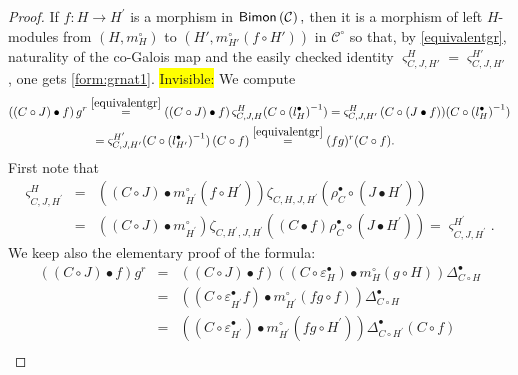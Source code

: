 \documentclass[nosumlimits,twoside]{amsart}
\theoremstyle{definition}
\theoremstyle{remark}
\newenvironment{invisible}{{\noindent\sc \colorbox{yellow}{Invisible:}\;}\color{gray}}{\medskip}
\newcommand{\Cc}{\mathcal{C}}
\def\Bimon{{\sf Bimon}}
\begin{document}
\begin{proof}
If $f:H\rightarrow H^{\prime }$ is a morphism in $\Bimon \left(
\mathcal{C}\right) ,$ then it is a morphism of left $H$-modules from $(H,m^\circ_H)$ to $(H',m^\circ_{H'}(f\circ H'))$ in $\Cc^\circ$ so that, by \eqref{equivalentgr}, naturality of the co-Galois map and the easily checked identity $\varsigma^H _{C,J,H'}=\varsigma^{H'} _{C,J,H'}$, one gets \eqref{form:grnat1}.
\begin{invisible} We compute 
\[
\begin{split}
    \left( \left( C\circ J\right) \bullet f\right) g^{r}&\overset{\eqref{equivalentgr}}{=}\left( \left( C\circ J\right) \bullet f\right)\varsigma^H _{C,J,H}(C\circ \left(
l_{H}^{\bullet }\right) ^{-1})=\varsigma^H _{C,J,H'}\left( C\circ (J\bullet f\right))(C\circ \left(
l_{H}^{\bullet }\right) ^{-1})\\&\hspace{0.13cm}=\varsigma^{H'} _{C,J,H'}(C\circ \left(
l_{H'}^{\bullet }\right) ^{-1})\left( C\circ f\right)\overset{\eqref{equivalentgr}}{=}(fg)^{r}(C\circ f).
\end{split}
\]
First note that \begin{eqnarray*}
\varsigma _{C,J,H^{\prime }}^{H} &=&\left( \left( C\circ J\right) \bullet
m_{H^{\prime }}^{\circ }\left( f\circ H^{\prime }\right) \right) \zeta
_{C,H,J,H^{\prime }}\left( \rho _{C}^{\bullet }\circ \left( J\bullet
H^{\prime }\right) \right)  \\
&=&\left( \left( C\circ J\right) \bullet m_{H^{\prime }}^{\circ } \right) \zeta _{C,H^{\prime },J,H^{\prime }}\left(
\left( C\bullet f\right) \rho _{C}^{\bullet }\circ \left( J\bullet H^{\prime
}\right) \right) =\varsigma _{C,J,H^{\prime }}^{H^{\prime }}.
\end{eqnarray*}
We keep also the elementary proof of the formula:
\begin{eqnarray*}
\left( \left( C\circ J\right) \bullet f\right) g^{r} &=&\left( \left( C\circ
J\right) \bullet f\right) \left( \left( C\circ \varepsilon _{H}^{\bullet
}\right) \bullet m_{H}^{\circ }\left( g\circ H\right) \right) \Delta^{\bullet}
_{C\circ H} \\
&=&\left( \left( C\circ \varepsilon _{H^{\prime }}^{\bullet }f\right)
\bullet m_{H^{\prime }}^{\circ }\left( fg\circ f\right) \right) \Delta^{\bullet}
_{C\circ H} \\
&=&\left( \left( C\circ \varepsilon _{H^{\prime }}^{\bullet }\right) \bullet
m_{H^{\prime }}^{\circ }\left( fg\circ H^{\prime }\right) \right) \Delta^{\bullet}
_{C\circ H^{\prime }}\left( C\circ f\right)  \\

\end{eqnarray*}
\end{invisible}
\end{proof}
\end{document}
